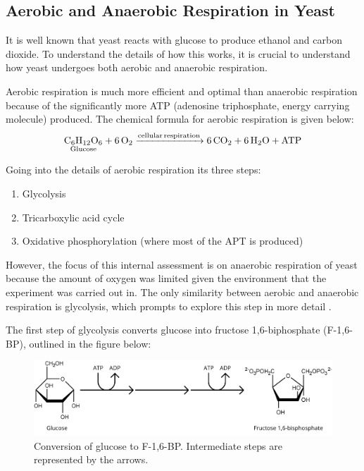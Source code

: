 \documentclass{article}
\begin{document}
\subsection{Aerobic and Anaerobic Respiration in Yeast}
It is well known that yeast reacts with glucose to produce ethanol and carbon dioxide. To understand the details of how this works, it is crucial to understand how yeast undergoes both aerobic and anaerobic respiration.

\medskip

Aerobic respiration is much more efficient and optimal than anaerobic respiration because of the significantly more ATP (adenosine triphosphate, energy carrying molecule) produced. The chemical formula for aerobic respiration is given below:
\begin{equation}
    \ce{\underset{\text{Glucose}}{\ce{C6H12O6}} + 6O2 ->[cellular respiration] 6CO2 + 6H2O + ATP}
\end{equation}

Going into the details of aerobic respiration its three steps:
\begin{enumerate}[topsep=\parskip, noitemsep]
    \item Glycolysis
    \item Tricarboxylic acid cycle
    \item Oxidative phosphorylation (where most of the APT is produced)
\end{enumerate}


\medskip

However, the focus of this internal assessment is on anaerobic respiration of yeast because the amount of oxygen was limited given the environment that the experiment was carried out in. The only similarity between aerobic and anaerobic respiration is glycolysis, which prompts to explore this step in more detail \parencite{ref}.

\medskip

The first step of glycolysis converts glucose into fructose 1,6-biphosphate (F-1,6-BP), outlined in the figure below:
\begin{figure}[H]
    \centering
    \includegraphics[width=0.8\linewidth]{figures/figure_01.png}
    \caption{Conversion of glucose to F-1,6-BP. Intermediate steps are represented by the arrows.}
    \label{fig:figure1}
\end{figure}
\end{document}
